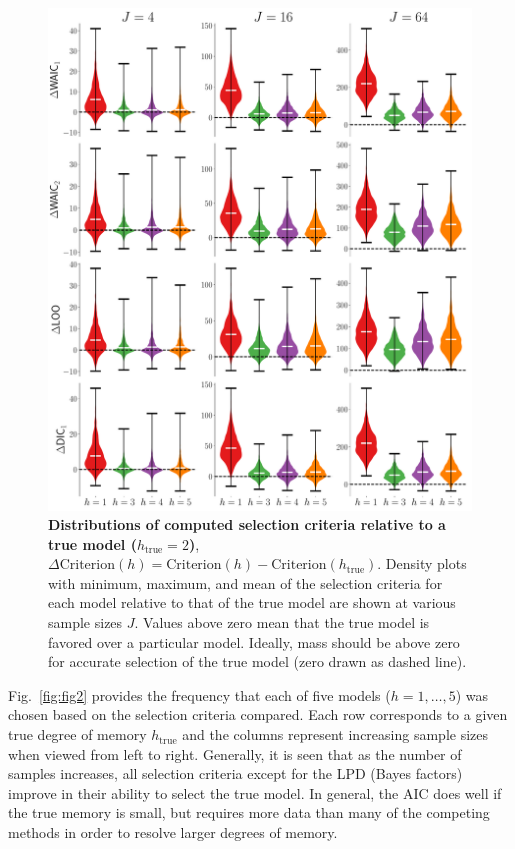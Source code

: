 \documentclass[prl,twocolumn,groupedaddress]{revtex4-1}
\begin{document}
\begin{figure}
\includegraphics[width=\linewidth]{fig3}
\caption{\textbf{Distributions of computed selection criteria relative to a true model ($h_{\textrm{true}}=2$)}, $\Delta\textrm{Criterion}(h)=\textrm{Criterion}(h)-\textrm{Criterion}(h_{\textrm{true}})$.  Density plots with minimum, maximum, and mean of the selection criteria for each model relative to that of the true model are shown at various sample sizes $J$. Values above zero mean that the true model is favored over a particular model. Ideally, mass should be above zero for accurate selection of the true model (zero drawn as dashed line).}
\label{fig:fig3}
\end{figure}

Fig.~\ref{fig:fig2} provides the frequency that each of five models ($h=1,\ldots,5$) was chosen based on the selection criteria compared. Each row corresponds to a given true degree of memory $h_{\textrm{true}}$ and the columns represent increasing sample sizes when viewed from left to right. Generally, it is seen that as the number of samples increases, all selection criteria except for the LPD (Bayes factors) improve in their ability to select the true model.  In general, the AIC does well if the true memory is small, but requires more data than many of the competing methods in order to resolve larger degrees of memory. 
\end{document}
